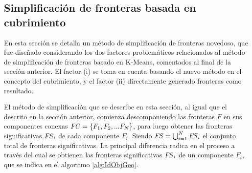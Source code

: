 

\subsection{Simplificación de fronteras basada en cubrimiento}\label{subsec:MiSimp}
En esta sección se detalla un método de simplificación de fronteras novedoso,
que fue diseñado considerando los dos factores problemáticos relacionados al
método de simplificación de fronteras basado en K-Means, comentados
al final de la sección anterior. El factor (i) se toma en cuenta basando el
nuevo método en el concepto del cubrimiento, y el factor (ii) directamente
generado fronteras como resultado.

El método de simplificación que se describe en esta sección, al igual que el
descrito en la sección anterior, comienza descomponiendo las fronteras $F$ en
sus componentes conexas $\mathit{FC}=\{F_1,F_2,...F_N\}$, para luego obtener las
fronteras significativas $\mathit{FS}_i$ de cada componente $F_i$. Siendo
$\mathit{FS} = \bigcup^N_{i=1} \mathit{FS}_i$ el conjunto total de fronteras
significativas. La principal diferencia radica en el proceso a través del cual
se obtienen las fronteras significativas $\mathit{FS}_i$ de un componente $F_i$, que
se indica en el algoritmo \ref{alg:IdObjGeo}.

